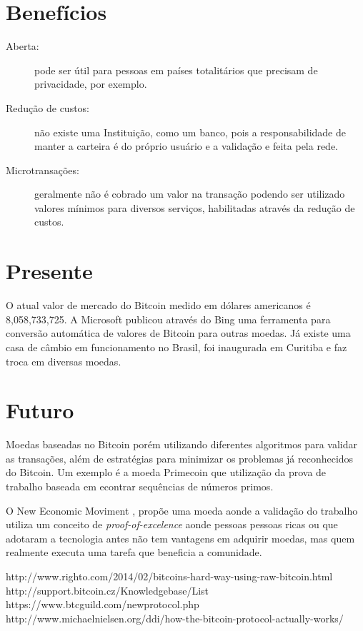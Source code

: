 \documentclass[a4paper,11pt]{article}
\theoremstyle{mytheor}
\begin{document}
\section*{Benefícios}
\begin{description}
\item[Aberta:] pode ser útil para pessoas em países totalitários que precisam de privacidade, por exemplo. 
\item[Redução de custos:] não existe uma Instituição, como um banco, pois a responsabilidade de manter a carteira é do próprio usuário e a validação e feita pela rede.
\item[Microtransações:] geralmente não é cobrado um valor na transação podendo ser utilizado valores mínimos para diversos serviços, habilitadas através da redução de custos.
\end{description}

\section*{Presente}
O atual valor de mercado do Bitcoin medido em dólares americanos é 8,058,733,725.
A Microsoft publicou \cite{bing} através do Bing uma ferramenta para conversão automática de valores de Bitcoin para outras moedas. Já existe uma casa de câmbio em funcionamento no Brasil, foi inaugurada em Curitiba e faz troca em diversas moedas. 

\section*{Futuro}

Moedas baseadas no Bitcoin porém utilizando diferentes algoritmos para validar as transações, além de estratégias para minimizar os problemas já reconhecidos do Bitcoin. Um exemplo é a moeda Primecoin que utilização da prova de trabalho baseada em econtrar sequências de números primos.

O New Economic Moviment \cite{nem}, propõe uma moeda aonde a validação do trabalho utiliza um conceito de \textit{proof-of-excelence} aonde pessoas pessoas ricas ou que adotaram a tecnologia antes não tem vantagens em adquirir moedas, mas quem realmente executa uma tarefa que beneficia a comunidade.


{}
http://www.righto.com/2014/02/bitcoins-hard-way-using-raw-bitcoin.html
http://support.bitcoin.cz/Knowledgebase/List
https://www.btcguild.com/new\textunderscore protocol.php
http://www.michaelnielsen.org/ddi/how-the-bitcoin-protocol-actually-works/

\end{document}
